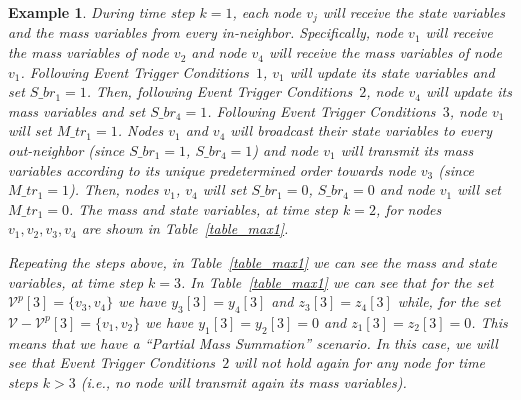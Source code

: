 \documentclass[twocolumn]{autart}    %
\newtheorem{example}{\bfseries Example}
\begin{document}
\begin{example}
During time step $k=1$, each node $v_j$ will receive the state variables and the mass variables from every in-neighbor. 
Specifically, node $v_1$ will receive the mass variables of node $v_2$ and node $v_4$ will receive the mass variables of node $v_1$. 
Following Event Trigger Conditions~$1$, $v_1$ will update its state variables and set $S\_br_1 = 1$. 
Then, following Event Trigger Conditions~$2$, node $v_4$ will update its mass variables and set $S\_br_4 = 1$. 
Following Event Trigger Conditions~$3$, node $v_1$ will set $M\_tr_1 = 1$. 
Nodes $v_1$ and $v_4$ will broadcast their state variables to every out-neighbor (since $S\_br_1 = 1$, $S\_br_4 = 1$) and node $v_1$ will transmit its mass variables according to its unique predetermined order towards node $v_3$ (since $M\_tr_1 = 1$). 
Then, nodes $v_1$, $v_4$ will set $S\_br_1 = 0$, $S\_br_4 = 0$ and node $v_1$ will set $M\_tr_1 = 0$. 
The mass and state variables, at time step $k=2$, for nodes $v_1, v_2, v_3, v_4$ are shown in Table~\ref{table_max1}. 


Repeating the steps above, in Table~\ref{table_max1} we can see the mass and state variables, at time step $k=3$. 
In Table~\ref{table_max1} we can see that for the set $\mathcal{V}^p[3] = \{v_3, v_4\}$ we have $y_3[3] = y_4[3]$ and $z_3[3] = z_4[3]$ while, for the set $ \mathcal{V} - \mathcal{V}^p[3] = \{v_1, v_2\}$ we have $y_1[3] = y_2[3] = 0$ and $z_1[3] = z_2[3] = 0$. 
This means that we have a ``Partial Mass Summation'' scenario. 
In this case, we will see that Event Trigger Conditions~$2$ will not hold again for any node for time steps $k > 3$ (i.e., no node will transmit again its mass variables). 



\end{example}
\end{document}
